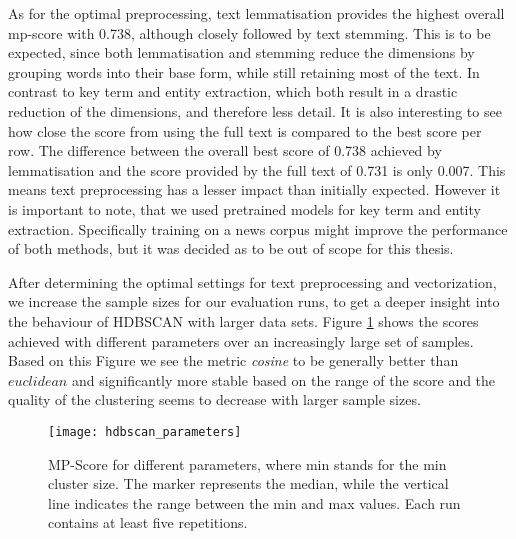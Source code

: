 As for the optimal preprocessing, text lemmatisation provides the highest overall mp-score with 0.738, although closely followed by text stemming. This is to be expected, since both lemmatisation and stemming reduce the dimensions by grouping words into their base form, while still retaining most of the text.
In contrast to key term and entity extraction, which both result in a drastic reduction of the dimensions, and therefore less detail. It is also interesting to see how close the score from using the full text is compared to the best score per row. The difference between the overall best score of 0.738 achieved by lemmatisation and the score provided by the full text of 0.731 is only 0.007. This means text preprocessing has a lesser impact than initially expected.   
However it is important to note, that we used pretrained models for key term and entity extraction.
Specifically training on a news corpus might improve the performance of both methods, but it was decided as to be out of scope for this thesis.

After determining the optimal settings for text preprocessing and vectorization, we increase the sample sizes for our evaluation runs, to get a deeper insight into the behaviour of HDBSCAN with larger data sets. Figure \ref{fig:hdbscan_parameters} shows the scores achieved with different parameters over an increasingly large set of samples. Based on this Figure we see the metric \textit{cosine} to be generally better than $euclidean$ and significantly more stable based on the range of the score and the quality of the clustering seems to decrease with larger sample sizes.

\begin{figure}[h]
    \centering
    \texttt{[image: hdbscan\_parameters]}
    \caption{MP-Score for different parameters, where min stands for the min cluster size. The marker represents the median, while the vertical line indicates the range between the min and max values. Each run contains at least five repetitions.}
    \label{fig:hdbscan_parameters}
\end{figure}

